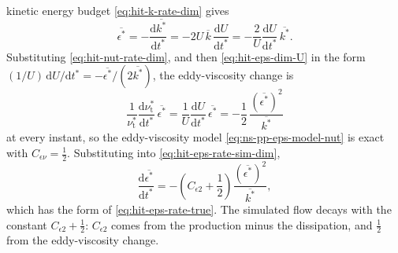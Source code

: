 \documentclass{article}
\begin{document}
kinetic energy budget \eqref{eq:hit-k-rate-dim} gives
\begin{equation}\label{eq:hit-eps-dim-U}
  \overline{\epsilon^*}
  = -\frac{\mathrm{d} \overline{k^*}}{\mathrm{d} t^*}
  = -2U\, \overline{k}\, \frac{\mathrm{d}U}{\mathrm{d}t^*}
  = -\frac{2}{U}\frac{\mathrm{d}U}{\mathrm{d}t^*}\, \overline{k^*} .
\end{equation}
Substituting \eqref{eq:hit-nut-rate-dim}, and then \eqref{eq:hit-eps-dim-U}
in the form $(1/U)\, \mathrm{d}U/\mathrm{d}t^* = -\overline{\epsilon^*}/(2\overline{k^*})$,
the eddy-viscosity change is
\begin{equation}\label{eq:hit-nut-change-dim}
  \frac{1}{\nu_{\mathrm{t}}^*}\frac{\mathrm{d}\nu_{\mathrm{t}}^*}{\mathrm{d}t^*}\, \overline{\epsilon^*}
  = \frac{1}{U}\frac{\mathrm{d}U}{\mathrm{d}t^*}\, \overline{\epsilon^*}
  = -\frac{1}{2}\, \frac{\left(\overline{\epsilon^*}\right)^2}{\overline{k^*}}
\end{equation}
at every instant, so the eddy-viscosity model \eqref{eq:ns-pp-eps-model-nut}
is exact with $C_{\epsilon\nu} = \tfrac12$. Substituting into
\eqref{eq:hit-eps-rate-sim-dim},
\begin{equation}\label{eq:hit-eps-rate-sim-closed}
  \frac{\mathrm{d} \overline{\epsilon^*}}{\mathrm{d} t^*}
  = -\left( C_{\epsilon 2} + \frac{1}{2} \right) \frac{\left(\overline{\epsilon^*}\right)^2}{\overline{k^*}} ,
\end{equation}
which has the form of \eqref{eq:hit-eps-rate-true}. The simulated flow decays
with the constant $C_{\epsilon 2} + \tfrac12$: $C_{\epsilon 2}$ comes from the
production minus the dissipation, and $\tfrac12$ from the eddy-viscosity
change.
\end{document}
